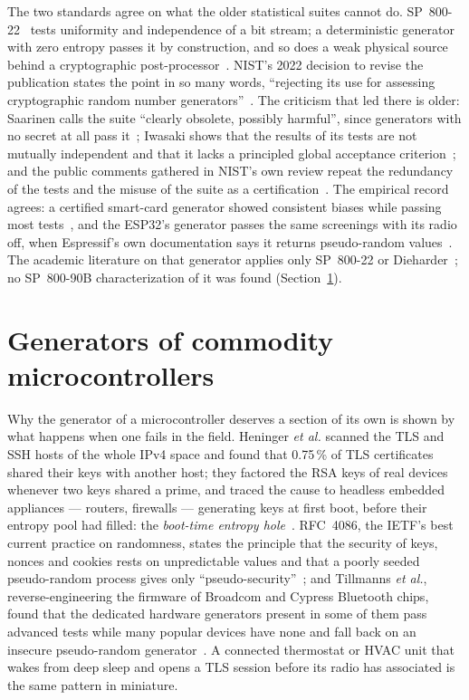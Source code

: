The two standards agree on what the older statistical suites cannot do.
SP~800-22~\cite{bassham_2010_sp80022} tests uniformity and independence of
a bit stream; a deterministic generator with zero entropy passes it by
construction, and so does a weak physical source behind a cryptographic
post-processor~\cite{saarinen_2021_entropy}. NIST's 2022 decision to
revise the publication states the point in so many words, ``rejecting its
use for assessing cryptographic random number generators''~\cite{nist_2022_decision}.
The criticism that led there is older: Saarinen calls the suite ``clearly
obsolete, possibly harmful'', since generators with no secret at all pass
it~\cite{saarinen_2022_obsolete}; Iwasaki shows that the results of its
tests are not mutually independent and that it lacks a principled global
acceptance criterion~\cite{iwasaki_2017_analysis}; and the public comments
gathered in NIST's own review repeat the redundancy of the tests and the
misuse of the suite as a certification~\cite{nist_2021_sp80022_comments}.
The empirical record agrees: a certified smart-card generator showed
consistent biases while passing most tests~\cite{hurleysmith_2018_certifiably,
hurleysmith_2018_great}, and the ESP32's generator passes the same
screenings with its radio off, when Espressif's own documentation says it
returns pseudo-random values~\cite{espressif_idf_random, espressif_trm_esp32,
blancoromero_2026_entropy}. The academic literature on that generator
applies only SP~800-22 or Dieharder~\cite{castillo_2026_automated,
hidayatulloh_2024_performance}; no SP~800-90B characterization of it was
found (Section~\ref{sec:soa_mcu}).

\section{Generators of commodity microcontrollers}
\label{sec:soa_mcu}

Why the generator of a microcontroller deserves a section of its own is
shown by what happens when one fails in the field. Heninger \emph{et al.}
scanned the TLS and SSH hosts of the whole IPv4 space and found that
0.75\,\% of TLS certificates shared their keys with another host; they
factored the RSA keys of real devices whenever two keys shared a prime, and
traced the cause to headless embedded appliances --- routers, firewalls ---
generating keys at first boot, before their entropy pool had filled: the
\emph{boot-time entropy hole}~\cite{heninger_2012_mining}. RFC~4086, the
IETF's best current practice on randomness, states the principle that the
security of keys, nonces and cookies rests on unpredictable values and that
a poorly seeded pseudo-random process gives only
``pseudo-security''~\cite{eastlake_2005_rfc4086}; and Tillmanns \emph{et
al.}, reverse-engineering the firmware of Broadcom and Cypress Bluetooth
chips, found that the dedicated hardware generators present in some of
them pass advanced tests while many popular devices have none and fall
back on an insecure pseudo-random generator~\cite{tillmanns_2020_firmware}.
A connected thermostat or HVAC unit that wakes from deep sleep and opens a
TLS session before its radio has associated is the same pattern in
miniature.

